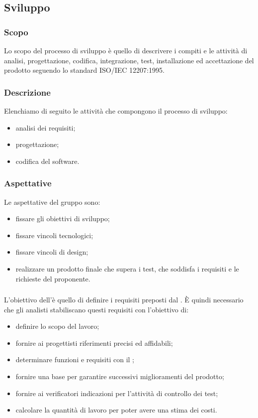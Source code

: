 \subsection{Sviluppo}
\subsubsection{Scopo}
Lo scopo del processo di sviluppo è quello di descrivere i compiti e le attività di analisi, progettazione, codifica, integrazione, test, installazione ed accettazione del prodotto seguendo lo standard ISO/IEC 12207:1995.

\subsubsection{Descrizione}
Elenchiamo di seguito le attività che compongono il processo di sviluppo:
\begin{itemize}
    \item analisi dei requisiti;
    \item progettazione;
    \item codifica del software.
\end{itemize}

\subsubsection{Aspettative}
Le aspettative del gruppo sono:
\begin{itemize}
    \item fissare gli obiettivi di sviluppo;
    \item fissare vincoli tecnologici;
    \item fissare vincoli di design;
    \item realizzare un prodotto finale che supera i test, che soddisfa i requisiti e le richieste del proponente.
\end{itemize}

\subsubsection{\AdR{}}
L'obiettivo dell'\AdRv{}è quello di definire i requisiti preposti dal \proponProg{}. È quindi necessario che gli analisti stabiliscano questi requisiti con l'obiettivo di:
\begin{itemize}
    \item definire lo scopo del lavoro;
    \item fornire ai progettisti riferimenti precisi ed affidabili;
    \item determinare funzioni e requisiti con il \proponProg;
    \item fornire una base per garantire successivi miglioramenti del prodotto;
    \item fornire ai verificatori indicazioni per l'attività di controllo dei test;
    \item calcolare la quantità di lavoro per poter avere una stima dei costi.
\end{itemize}

